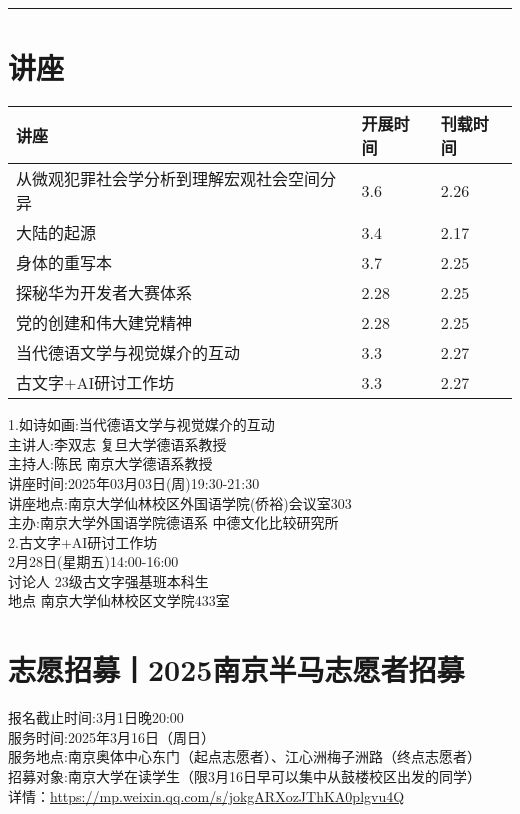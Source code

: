 \documentclass[letterpaper, 12pt]{article}
\begin{document}
\hrule
\pagebreak
\begin{multicols}{2}

\section{讲座}
\begin{tabular}{|>{\centering\arraybackslash}m{}|m{}|m{}|}
    \hline
    讲座 & 开展时间 & 刊载时间\\

    \hline\hline
    从微观犯罪社会学分析到理解宏观社会空间分异   &3.6  &2.26 \\\hline
    大陆的起源 & 3.4 & 2.17\\\hline
    身体的重写本 & 3.7 & 2.25\\\hline
    探秘华为开发者大赛体系 & 2.28 & 2.25\\\hline
    党的创建和伟大建党精神 & 2.28 & 2.25\\\hline
    当代德语文学与视觉媒介的互动 & 3.3 & 2.27\\\hline
    古文字+AI研讨工作坊 & 3.3 & 2.27\\\hline
\end{tabular}
1.如诗如画:当代德语文学与视觉媒介的互动\\
主讲人:李双志  复旦大学德语系教授\\
主持人:陈民 南京大学德语系教授\\
讲座时间:2025年03月03日(周)19:30-21:30\\
讲座地点:南京大学仙林校区外国语学院(侨裕)会议室303\\
主办:南京大学外国语学院德语系 中德文化比较研究所\\

2.古文字+AI研讨工作坊\\
2月28日(星期五)14:00-16:00\\
讨论人 23级古文字强基班本科生\\
地点 南京大学仙林校区文学院433室\\
\section{志愿招募丨2025南京半马志愿者招募}
报名截止时间:3月1日晚20:00\\
服务时间:2025年3月16日（周日）\\
服务地点:南京奥体中心东门（起点志愿者）、江心洲梅子洲路（终点志愿者）\\
招募对象:南京大学在读学生（限3月16日早可以集中从鼓楼校区出发的同学）\\
详情：\url{https://mp.weixin.qq.com/s/jokgARXozJThKA0plgvu4Q}\\

\end{multicols}
\end{document}
